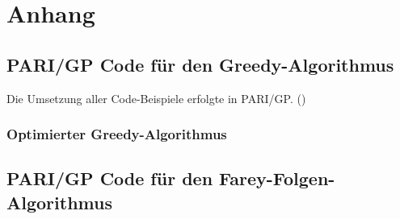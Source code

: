 \section{Anhang}
\subsection{PARI/GP Code für den Greedy-Algorithmus}\label{code:greedy}
Die Umsetzung aller Code-Beispiele erfolgte in PARI/GP. (\cite{PARI2018})

\clearpage
\subsubsection{Optimierter Greedy-Algorithmus}

\clearpage
\subsection{PARI/GP Code für den Farey-Folgen-Algorithmus}
